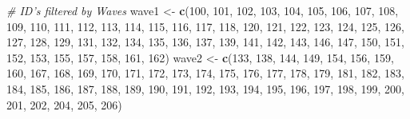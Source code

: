 \documentclass[
]{book}
\newenvironment{Shaded}{\begin{snugshade}}{\end{snugshade}}
\newcommand{\CommentTok}[1]{\textcolor[rgb]{0.56,0.35,0.01}{\textit{#1}}}
\newcommand{\DecValTok}[1]{\textcolor[rgb]{0.00,0.00,0.81}{#1}}
\newcommand{\KeywordTok}[1]{\textcolor[rgb]{0.13,0.29,0.53}{\textbf{#1}}}
\newcommand{\NormalTok}[1]{#1}
\newcommand{\StringTok}[1]{\textcolor[rgb]{0.31,0.60,0.02}{#1}}
\begin{document}
\begin{Shaded}
\begin{Highlighting}[]
\CommentTok{# ID's filtered by Waves}
\NormalTok{wave1 <-}\StringTok{ }\KeywordTok{c}\NormalTok{(}\DecValTok{100}\NormalTok{, }\DecValTok{101}\NormalTok{,    }\DecValTok{102}\NormalTok{,    }\DecValTok{103}\NormalTok{,    }\DecValTok{104}\NormalTok{,    }\DecValTok{105}\NormalTok{,    }\DecValTok{106}\NormalTok{,    }\DecValTok{107}\NormalTok{,    }\DecValTok{108}\NormalTok{,    }\DecValTok{109}\NormalTok{,    }\DecValTok{110}\NormalTok{,    }\DecValTok{111}\NormalTok{,    }\DecValTok{112}\NormalTok{,    }\DecValTok{113}\NormalTok{,    }\DecValTok{114}\NormalTok{,    }\DecValTok{115}\NormalTok{,    }\DecValTok{116}\NormalTok{,    }\DecValTok{117}\NormalTok{,    }\DecValTok{118}\NormalTok{,    }\DecValTok{120}\NormalTok{,    }\DecValTok{121}\NormalTok{,    }\DecValTok{122}\NormalTok{,    }\DecValTok{123}\NormalTok{,}
           \DecValTok{124}\NormalTok{, }\DecValTok{125}\NormalTok{,    }\DecValTok{126}\NormalTok{,    }\DecValTok{127}\NormalTok{,    }\DecValTok{128}\NormalTok{,    }\DecValTok{129}\NormalTok{,    }\DecValTok{131}\NormalTok{,    }\DecValTok{132}\NormalTok{,    }\DecValTok{134}\NormalTok{,    }\DecValTok{135}\NormalTok{,    }\DecValTok{136}\NormalTok{,    }\DecValTok{137}\NormalTok{,    }\DecValTok{139}\NormalTok{,    }\DecValTok{141}\NormalTok{,    }\DecValTok{142}\NormalTok{,    }\DecValTok{143}\NormalTok{,    }\DecValTok{146}\NormalTok{,    }\DecValTok{147}\NormalTok{,    }\DecValTok{150}\NormalTok{,    }\DecValTok{151}\NormalTok{,    }\DecValTok{152}\NormalTok{,    }\DecValTok{153}\NormalTok{,    }\DecValTok{155}\NormalTok{,}
           \DecValTok{157}\NormalTok{, }\DecValTok{158}\NormalTok{,    }\DecValTok{161}\NormalTok{,    }\DecValTok{162}\NormalTok{)}
\NormalTok{wave2 <-}\StringTok{ }\KeywordTok{c}\NormalTok{(}\DecValTok{133}\NormalTok{, }\DecValTok{138}\NormalTok{,  }\DecValTok{144}\NormalTok{,  }\DecValTok{149}\NormalTok{,  }\DecValTok{154}\NormalTok{,  }\DecValTok{156}\NormalTok{,  }\DecValTok{159}\NormalTok{,  }\DecValTok{160}\NormalTok{,  }\DecValTok{167}\NormalTok{,  }\DecValTok{168}\NormalTok{,  }\DecValTok{169}\NormalTok{,  }\DecValTok{170}\NormalTok{,  }\DecValTok{171}\NormalTok{,  }\DecValTok{172}\NormalTok{,  }\DecValTok{173}\NormalTok{,  }\DecValTok{174}\NormalTok{,  }\DecValTok{175}\NormalTok{,  }\DecValTok{176}\NormalTok{,  }\DecValTok{177}\NormalTok{,  }\DecValTok{178}\NormalTok{,  }\DecValTok{179}\NormalTok{,  }\DecValTok{181}\NormalTok{,  }\DecValTok{182}\NormalTok{,}
           \DecValTok{183}\NormalTok{, }\DecValTok{184}\NormalTok{,  }\DecValTok{185}\NormalTok{,  }\DecValTok{186}\NormalTok{,  }\DecValTok{187}\NormalTok{,  }\DecValTok{188}\NormalTok{,  }\DecValTok{189}\NormalTok{,  }\DecValTok{190}\NormalTok{,  }\DecValTok{191}\NormalTok{,  }\DecValTok{192}\NormalTok{,  }\DecValTok{193}\NormalTok{,  }\DecValTok{194}\NormalTok{,  }\DecValTok{195}\NormalTok{,  }\DecValTok{196}\NormalTok{,  }\DecValTok{197}\NormalTok{,  }\DecValTok{198}\NormalTok{,  }\DecValTok{199}\NormalTok{,  }\DecValTok{200}\NormalTok{,  }\DecValTok{201}\NormalTok{,  }\DecValTok{202}\NormalTok{,  }\DecValTok{204}\NormalTok{,  }\DecValTok{205}\NormalTok{,  }\DecValTok{206}\NormalTok{)}

\end{Highlighting}
\end{Shaded}
\end{document}
